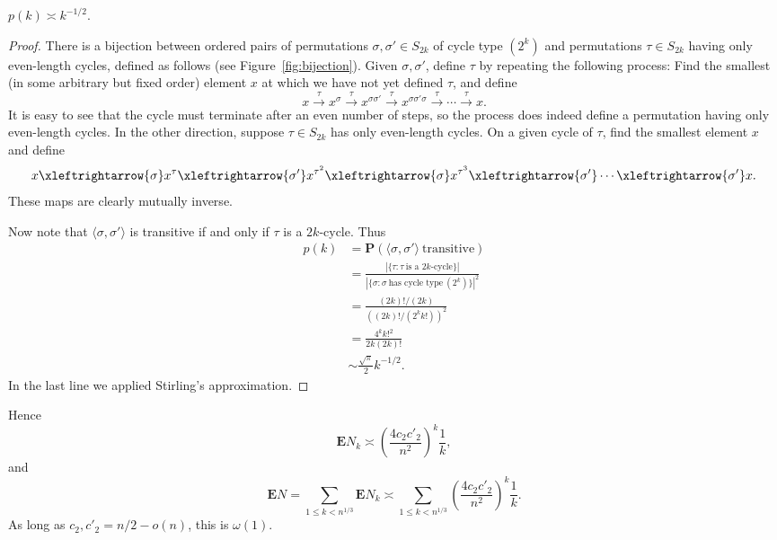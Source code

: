 \documentclass[ALCO,ThmDefs,Unicode,epreuves]{cedram}
\renewcommand\P{\mathbf{P}}
\newcommand\E{\mathbf{E}}
\newcommand\br[1]{\left({#1}\right)}
\newcommand\pfrac[2]{\br{\frac{#1}{#2}}}
\begin{document}
\begin{lemma} \label{lem:p(k)}
$ p(k) \asymp k^{-1/2}. $
\end{lemma}
\begin{proof}
There is a bijection between ordered pairs of permutations $\sigma, \sigma' \in S_{2k}$ of cycle type $(2^k)$ and permutations $\tau \in S_{2k}$ having only even-length cycles, defined as follows (see Figure~\ref{fig:bijection}). Given $\sigma, \sigma'$, define $\tau$ by repeating the following process: Find the smallest (in some arbitrary but fixed order) element $x$ at which we have not yet defined $\tau$, and define
\[
 x
 \xrightarrow\tau x^\sigma
 \xrightarrow\tau x^{\sigma \sigma'}
 \xrightarrow\tau x^{\sigma \sigma' \sigma}
 \xrightarrow\tau \cdots
 \xrightarrow\tau x.
\]
It is easy to see that the cycle must terminate after an even number of steps, so the process does indeed define a permutation having only even-length cycles. In the other direction, suppose $\tau \in S_{2k}$ has only even-length cycles. On a given cycle of $\tau$, find the smallest element $x$ and define
\[
 x
 \xleftrightarrow{\sigma} x^{\tau}
 \xleftrightarrow{\sigma'} x^{\tau^2}
 \xleftrightarrow{\sigma} x^{\tau^3}
 \xleftrightarrow{\sigma'} \cdots
 \xleftrightarrow{\sigma'} x.
\]
These maps are clearly mutually inverse.

Now note that $\langle \sigma, \sigma'\rangle$ is transitive if and only if $\tau$ is a $2k$-cycle. Thus
\begin{align*}
 p(k)
 &= \P(\langle \sigma, \sigma'\rangle~\text{transitive}) \\
 &= \frac{|\{\tau: \tau~\text{is a $2k$-cycle}\}|}{|\{\sigma: \sigma~\text{has cycle type}~(2^k)\}|^2} \\
 &= \frac{(2k)!/(2k)}{((2k)!/(2^k k!))^2} \\
 &= \frac{4^k k!^2}{2k (2k)!} \\
 &\sim \frac{\sqrt{\pi}}{2} k^{-1/2}.
\end{align*}
In the last line we applied Stirling's approximation.
\end{proof}

Hence
\[
 \E N_k \asymp \pfrac{4 c_2 c'_2}{n^2}^k \frac1{k},
\]
and
\[
 \E N = \sum_{1 \leq k < n^{1/3}} \E N_k \asymp \sum_{1 \leq k < n^{1/3}} \pfrac{4 c_2 c'_2}{n^2}^k \frac1k.
\]
As long as $c_2, c'_2 = n/2 - o(n)$, this is $\omega(1)$.
\end{document}
